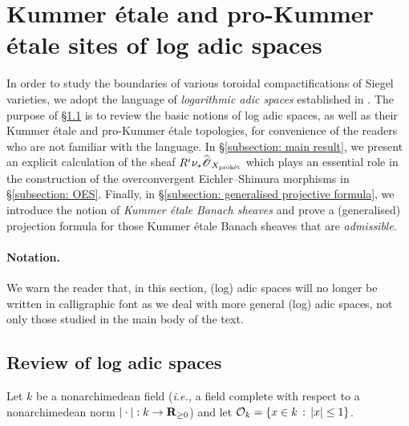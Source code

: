 \section{Kummer \'{e}tale and pro-Kummer \'{e}tale sites of log adic spaces}\label{Section: Kummer etale and pro-Kummer etale sites of log adic spaces}
In order to study the boundaries of various toroidal compactifications of Siegel varieties, we adopt the language of \emph{logarithmic adic spaces} established in \cite{Diao}. The purpose of \S\ref{subsection: review of Kummer etale and pro-Kummer etale sites} is to review the basic notions of log adic spaces, as well as their Kummer \'etale and pro-Kummer \'etale topologies, for convenience of the readers who are not familiar with the language. In \S\ref{subsection: main result}, we present an explicit calculation of the sheaf $R^i\nu_*\widehat{\operatorname{\mathscr{O}}}_{X_{\operatorname{\textrm{prok\'{e}t}}}}$ which plays an essential role in the construction of the overconvergent Eichler--Shimura morphisms in \S\ref{subsection: OES}. Finally, in \S \ref{subsection: generalised projective formula}, we introduce the notion of \emph{Kummer \'etale Banach sheaves} and prove a (generalised) projection formula for those Kummer \'etale Banach sheaves that are \emph{admissible}. 

\paragraph{Notation.} We warn the reader that, in this section, (log) adic spaces will no longer be written in calligraphic font as we deal with more general (log) adic spaces, not only those studied in the main body of the text. 

\subsection{Review of log adic spaces}\label{subsection: review of Kummer etale and pro-Kummer etale sites}
Let $k$ be a nonarchimedean field (\emph{i.e.,} a field complete with respect to a nonarchimedean norm $|\cdot|:k\rightarrow \operatorname{\mathbf{R}}_{\geq 0}$) and let $\operatorname{\mathcal{O}}_k=\{x\in k\,:\, |x|\leq 1\}$.  

